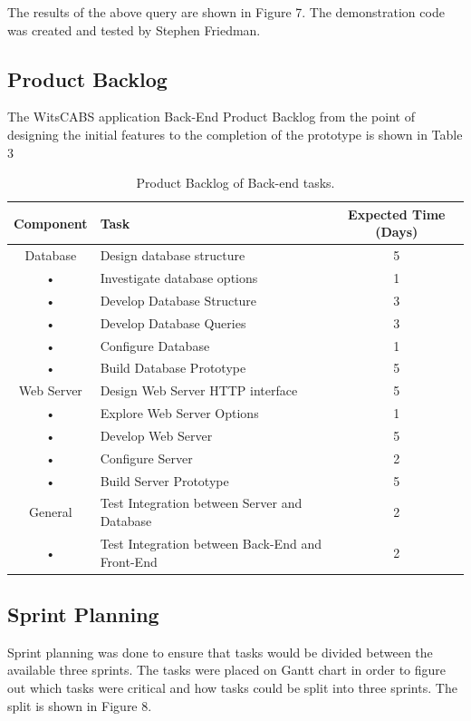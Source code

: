 \documentclass[12pt]{article}
\begin{document}
The results of the above query are shown in Figure 7. The demonstration code was created and tested by Stephen Friedman.

\subsection{Product Backlog}
The WitsCABS application Back-End Product Backlog from the point of designing the initial features to the completion of the prototype is shown in Table 3

\begin{table}[htb]
    \caption{Product Backlog of Back-end tasks.\label{tab:fonts}}
    \begin{center} 
\begin{tabular}{|c|l|c|}
\hline 
Component & Task & Expected Time (Days)\\ 
\hline 
Database & Design database structure & 5\\ 
• & Investigate database options & 1\\ 
• & Develop Database Structure & 3 \\
• & Develop Database Queries & 3\\
• & Configure Database & 1\\
• & Build Database Prototype & 5\\
\hline 
Web Server & Design Web Server HTTP interface & 5\\
• & Explore Web Server Options & 1\\ 
• & Develop Web Server & 5\\
• & Configure Server & 2\\
• & Build Server Prototype & 5\\
\hline 
General & Test Integration between Server and Database & 2\\
• & Test Integration between Back-End and Front-End & 2\\
\hline
\end{tabular}
\end{center}
\end{table}

\subsection{Sprint Planning}
Sprint planning was done to ensure that tasks would be divided between the available three sprints. The tasks were placed on Gantt chart in order to figure out which tasks were critical and how tasks could be split into three sprints. The split is shown in Figure 8.
\end{document}
